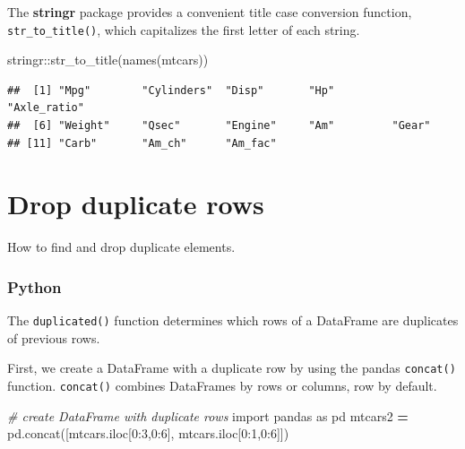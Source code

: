 \documentclass[
]{book}
\newenvironment{Shaded}{\begin{snugshade}}{\end{snugshade}}
\newcommand{\CommentTok}[1]{\textcolor[rgb]{0.56,0.35,0.01}{\textit{#1}}}
\newcommand{\DecValTok}[1]{\textcolor[rgb]{0.00,0.00,0.81}{#1}}
\newcommand{\FunctionTok}[1]{\textcolor[rgb]{0.00,0.00,0.00}{#1}}
\newcommand{\ImportTok}[1]{#1}
\newcommand{\NormalTok}[1]{#1}
\newcommand{\OperatorTok}[1]{\textcolor[rgb]{0.81,0.36,0.00}{\textbf{#1}}}
\newcommand{\SpecialCharTok}[1]{\textcolor[rgb]{0.00,0.00,0.00}{#1}}
\begin{document}
The \textbf{stringr} package provides a convenient title case conversion function, \texttt{str\_to\_title()}, which capitalizes the first letter of each string.

\begin{Shaded}
\begin{Highlighting}[]
\NormalTok{stringr}\SpecialCharTok{::}\FunctionTok{str\_to\_title}\NormalTok{(}\FunctionTok{names}\NormalTok{(mtcars))}
\end{Highlighting}
\end{Shaded}

\begin{verbatim}
##  [1] "Mpg"        "Cylinders"  "Disp"       "Hp"         "Axle_ratio"
##  [6] "Weight"     "Qsec"       "Engine"     "Am"         "Gear"      
## [11] "Carb"       "Am_ch"      "Am_fac"
\end{verbatim}

\hypertarget{drop-duplicate-rows}{%
\section{Drop duplicate rows}\label{drop-duplicate-rows}}

How to find and drop duplicate elements.

\hypertarget{python-27}{%
\subsubsection*{Python}\label{python-27}}

The \texttt{duplicated()} function determines which rows of a DataFrame are duplicates of previous rows.

First, we create a DataFrame with a duplicate row by using the pandas \texttt{concat()} function. \texttt{concat()} combines DataFrames by rows or columns, row by default.

\begin{Shaded}
\begin{Highlighting}[]
\CommentTok{\# create DataFrame with duplicate rows}
\ImportTok{import}\NormalTok{ pandas }\ImportTok{as}\NormalTok{ pd}
\NormalTok{mtcars2 }\OperatorTok{=}\NormalTok{ pd.concat([mtcars.iloc[}\DecValTok{0}\NormalTok{:}\DecValTok{3}\NormalTok{,}\DecValTok{0}\NormalTok{:}\DecValTok{6}\NormalTok{], mtcars.iloc[}\DecValTok{0}\NormalTok{:}\DecValTok{1}\NormalTok{,}\DecValTok{0}\NormalTok{:}\DecValTok{6}\NormalTok{]])}
\end{Highlighting}
\end{Shaded}
\end{document}
